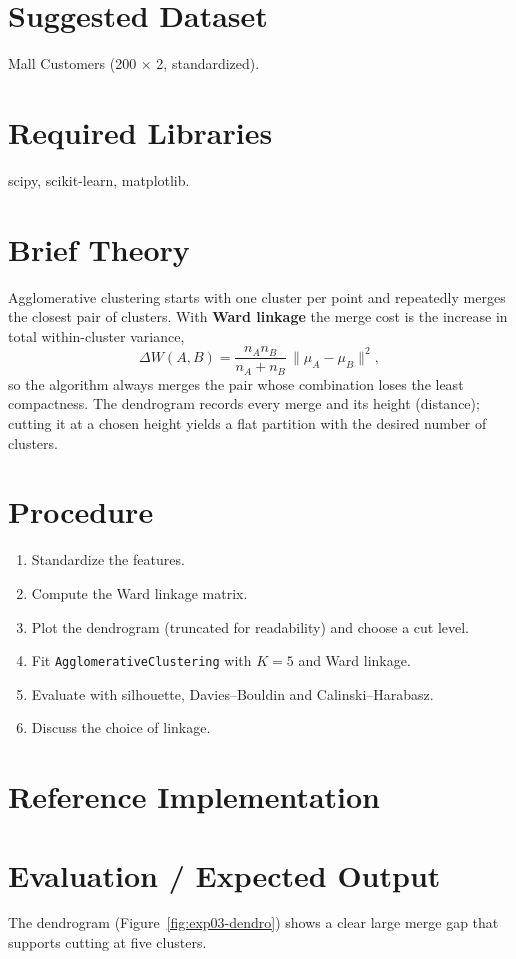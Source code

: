 \section{Suggested Dataset}
Mall Customers (200 $\times$ 2, standardized).

\section{Required Libraries}
scipy, scikit-learn, matplotlib.

\section{Brief Theory}
Agglomerative clustering starts with one cluster per point and repeatedly merges the closest
pair of clusters. With \textbf{Ward linkage} the merge cost is the increase in total
within-cluster variance,
\[
\Delta W(A, B) = \frac{n_A n_B}{n_A + n_B}\,\lVert \mu_A - \mu_B \rVert^2 ,
\]
so the algorithm always merges the pair whose combination loses the least compactness. The
dendrogram records every merge and its height (distance); cutting it at a chosen height
yields a flat partition with the desired number of clusters.

\section{Procedure}
\begin{enumerate}
  \item Standardize the features.
  \item Compute the Ward linkage matrix.
  \item Plot the dendrogram (truncated for readability) and choose a cut level.
  \item Fit \texttt{AgglomerativeClustering} with $K = 5$ and Ward linkage.
  \item Evaluate with silhouette, Davies--Bouldin and Calinski--Harabasz.
  \item Discuss the choice of linkage.
\end{enumerate}

\section{Reference Implementation}


\section{Evaluation / Expected Output}
The dendrogram (Figure~\ref{fig:exp03-dendro}) shows a clear large merge gap that supports
cutting at five clusters.


